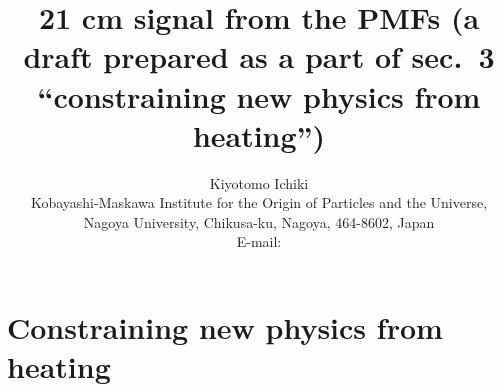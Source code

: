 \documentclass{PoS}
\author{Kiyotomo Ichiki\\
Kobayashi-Maskawa Institute for the Origin of Particles and
the Universe, Nagoya University, Chikusa-ku, Nagoya, 464-8602, Japan\\
E-mail: \email{ichiki@a.phys.nagoya-u.ac.jp}}
\title{21 cm signal from the PMFs (a draft prepared as a part of sec.~3
``constraining new physics from heating'')}
\begin{document}
\maketitle 

\setcounter{section}{2}
\section{Constraining new physics from heating}

\end{document}

